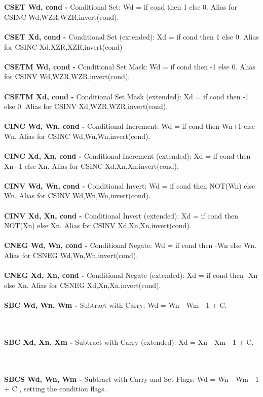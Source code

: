 \documentclass[12pt,a4paper,utf8]{ppgsi}
\begin{document}
\\\\\textbf{CSET Wd, cond -} Conditional Set: Wd = if cond then 1 else 0.
Alias for CSINC Wd,WZR,WZR,invert(cond). 
\\\\\textbf{CSET Xd, cond -} Conditional Set (extended): Xd = if cond then 1 else 0.
Alias for CSINC Xd,XZR,XZR,invert(cond)
\\\\\textbf{CSETM Wd, cond -} Conditional Set Mask: Wd = if cond then -1 else 0.
Alias for CSINV Wd,WZR,WZR,invert(cond).
\\\\\textbf{CSETM Xd, cond -} Conditional Set Mask (extended): Xd = if cond then -1 else 0.
Alias for CSINV Xd,WZR,WZR,invert(cond). 
\\\\\textbf{CINC Wd, Wn, cond -} Conditional Increment: Wd = if cond then Wn+1 else Wn.
Alias for CSINC Wd,Wn,Wn,invert(cond).
\\\\\textbf{CINC Xd, Xn, cond -} Conditional Increment (extended): Xd = if cond then Xn+1 else Xn.
Alias for CSINC Xd,Xn,Xn,invert(cond). 
\\\\\textbf{CINV Wd, Wn, cond -} Conditional Invert: Wd = if cond then NOT(Wn) else Wn.
Alias for CSINV Wd,Wn,Wn,invert(cond).
\\\\\textbf{CINV Xd, Xn, cond -} Conditional Invert (extended): Xd = if cond then NOT(Xn) else Xn.
Alias for CSINV Xd,Xn,Xn,invert(cond). 
\\\\\textbf{CNEG Wd, Wn, cond -} Conditional Negate: Wd = if cond then -Wn else Wn.
Alias for CSNEG Wd,Wn,Wn,invert(cond).
\\\\\textbf{CNEG Xd, Xn, cond -} Conditional Negate (extended): Xd = if cond then -Xn else Xn.
Alias for CSNEG Xd,Xn,Xn,invert(cond). 
\\\\\textbf{SBC Wd, Wn, Wm -} Subtract with Carry: Wd = Wn - Wm - 1 + C. 

\\\\\textbf{SBC Xd, Xn, Xm -} Subtract with Carry (extended): Xd = Xn - Xm - 1 + C. 

\\\\\textbf{SBCS Wd, Wn, Wm -} Subtract with Carry and Set Flags: Wd = Wn - Wm - 1 + C , setting the condition flags. 
\end{document}
